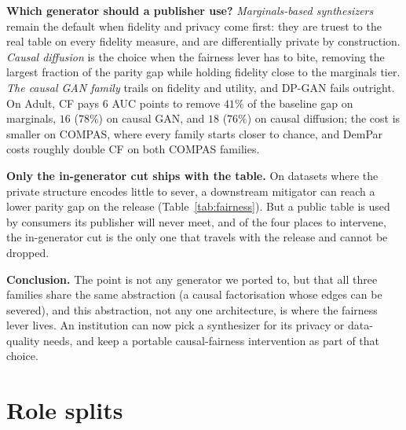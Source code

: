 \documentclass[manuscript,screen,review]{acmart}
\begin{document}
\textbf{Which generator should a publisher use?} \emph{Marginals-based
synthesizers} remain the default when fidelity and privacy come first: they
are truest to the real table on every fidelity measure, and are
differentially private by construction. \emph{Causal diffusion} is the
choice when the fairness lever has to bite, removing the largest fraction of
the parity gap while holding fidelity close to the marginals tier. \emph{The
causal GAN family} trails on fidelity and utility, and DP-GAN fails
outright. On Adult, CF pays $6$ AUC points to remove $41\%$ of the baseline
gap on marginals, $16$ ($78\%$) on causal GAN, and $18$ ($76\%$) on causal
diffusion; the cost is smaller on COMPAS, where every family starts closer
to chance, and DemPar costs roughly double CF on both COMPAS families. 

\textbf{Only the in-generator cut ships with the table.} On datasets where
the private structure encodes little to sever, a downstream mitigator can
reach a lower parity gap on the release (Table~\ref{tab:fairness}). But a
public table is used by consumers its publisher will never meet, and of the
four places to intervene, the in-generator cut is the only one that travels
with the release and cannot be dropped.

\textbf{Conclusion.} The point is not any generator we ported to, but that
all three families share the same abstraction (a causal factorisation whose
edges can be severed), and this abstraction, not any one architecture, is
where the fairness lever lives. An institution can now pick a synthesizer for
its privacy or data-quality needs, and keep a portable causal-fairness
intervention as part of that choice.

\newpage




\appendix

\section{Role splits}
\label{app:roles}
\end{document}
